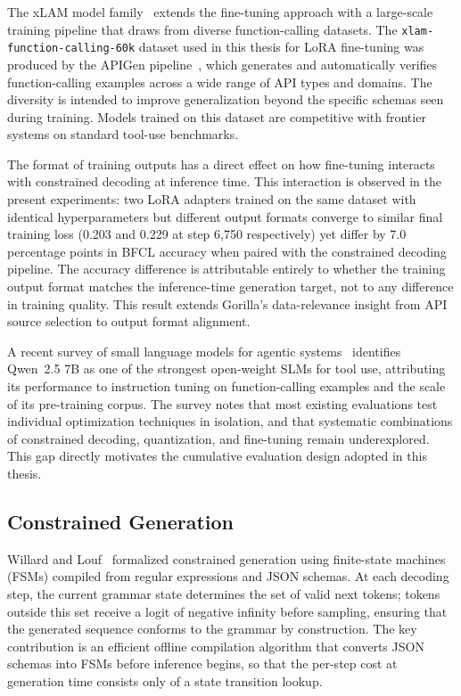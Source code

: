 The xLAM model family~\cite{zhang2024xlam} extends the fine-tuning
approach with a large-scale training pipeline that draws from diverse
function-calling datasets. The \texttt{xlam-function-calling-60k}
dataset used in this thesis for LoRA fine-tuning was produced by the
APIGen pipeline~\cite{liu2024apigen}, which generates and
automatically verifies function-calling examples across a wide range
of API types and domains. The diversity is intended to improve
generalization beyond the specific schemas seen during training.
Models trained on this dataset are competitive with frontier systems
on standard tool-use benchmarks.

The format of training outputs has a direct effect on how fine-tuning
interacts with constrained decoding at inference time. This
interaction is observed in the present experiments: two LoRA adapters
trained on the same dataset with identical hyperparameters but
different output formats converge to similar final training loss
(0.203 and 0.229 at step 6,750 respectively) yet differ by 7.0
percentage points in BFCL accuracy when paired with the constrained
decoding pipeline. The accuracy difference is attributable entirely
to whether the training output format matches the inference-time
generation target, not to any difference in training quality. This
result extends Gorilla's data-relevance insight from API source
selection to output format alignment.

A recent survey of small language models for agentic
systems~\cite{sharma2025slmagents} identifies Qwen~2.5 7B as one of
the strongest open-weight SLMs for tool use, attributing its performance to instruction tuning on
function-calling examples and the scale of its pre-training corpus.
The survey notes that most existing evaluations test individual
optimization techniques in isolation, and that systematic
combinations of constrained decoding, quantization, and fine-tuning
remain underexplored. This gap directly motivates the cumulative
evaluation design adopted in this thesis.

\subsection{Constrained Generation}

Willard and Louf~\cite{willard2023efficient} formalized constrained
generation using finite-state machines (FSMs) compiled from regular
expressions and JSON schemas. At each decoding step, the current
grammar state determines the set of valid next tokens; tokens outside
this set receive a logit of negative infinity before sampling,
ensuring that the generated sequence conforms to the grammar by
construction. The key contribution is an efficient offline
compilation algorithm that converts JSON schemas into FSMs before
inference begins, so that the per-step cost at generation time
consists only of a state transition lookup.

